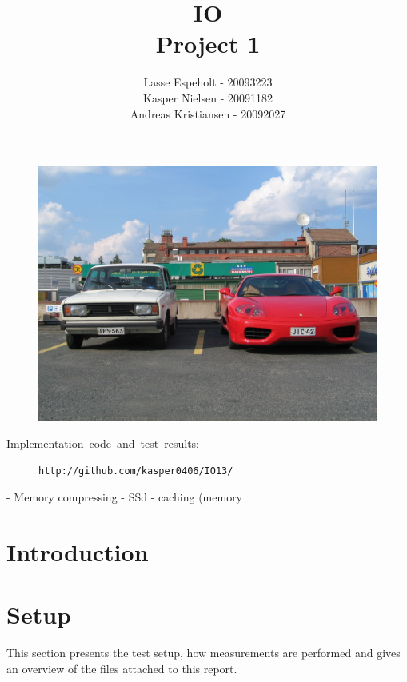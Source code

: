 \documentclass[a4paper,12pt]{article}
\begin{document}
\title{IO\\Project 1}

\author{Lasse Espeholt - 20093223\\
Kasper Nielsen - 20091182\\
Andreas Kristiansen - 20092027\\}

\maketitle
\begin{figure}[h!]
\includegraphics[width=\textwidth]{"images/forside"}
\end{figure}


\vfill{}
\begin{description}
\item [{Implementation~code~and~test~results:}]
\texttt{http://github.com/kasper0406/IO13/}
\end{description}
\pagebreak{}\tableofcontents{}\pagebreak{}

- Memory compressing
- SSd
- caching (memory

\section{Introduction}


\section{Setup}
This section presents the test setup, how measurements are performed
and gives an overview of the files attached to this report.
\end{document}
